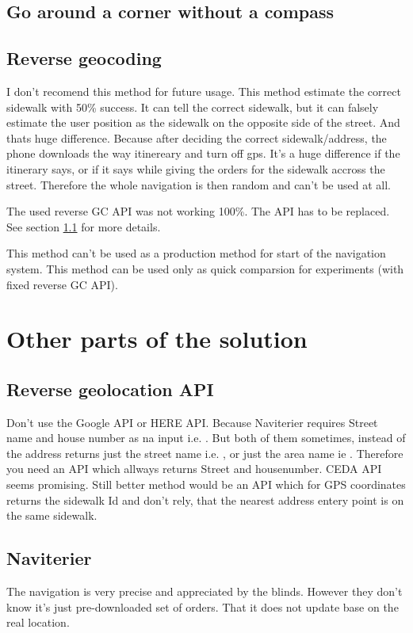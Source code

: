 \documentclass[11pt,oneside,a4paper]{book}
\begin{document}
			\subsection{Go around a corner without a compass}
				
			\subsection{Reverse geocoding}
				I don't recomend this method for future usage. This method estimate the correct sidewalk with 50\% success. It can tell the correct sidewalk, but it can falsely estimate the user position as the sidewalk on the opposite side of the street.  And thats huge difference. 
				Because after deciding the correct sidewalk/address, the phone downloads the way itinereary and turn off gps. It's a huge difference if the itinerary says,  or if it says  while giving the orders for the sidewalk accross the street. Therefore the whole navigation is then random and can't be used at all.
				
				The used reverse GC API was not working 100\%. The API has to be replaced. See section \ref{subsec:reverse-gc-api} for more details.
							
				This method can't be used as a production method for start of the navigation system.
				This method can be used only as quick comparsion for experiments (with fixed reverse GC API).
		
		\section{Other parts of the solution}	
			\subsection{Reverse geolocation API}
				\label{subsec:reverse-gc-api}
				Don't use the Google API or HERE API. Because Naviterier requires Street name and house number as na input i.e. . But both of them sometimes, instead of the address  returns just the street name i.e. , or just the area name ie . Therefore you need an API which allways returns Street and housenumber. CEDA API seems promising. Still better method would be an API which for GPS coordinates returns the sidewalk Id and don't rely, that the nearest address entery point is on the same sidewalk.	
			\subsection{Naviterier}
				The navigation is very precise and appreciated by the blinds. However they don't know it's just pre-downloaded set of orders. That it does not update base on the real location.
				
\end{document}
